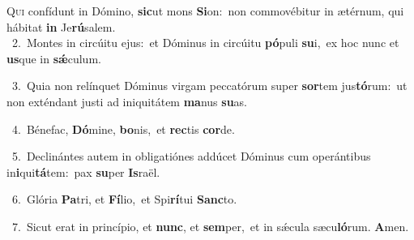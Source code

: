 \lettrine{\initial\textcolor{\initialcolor}{Q}}{ui} confídunt in Dómino, \textbf{sic}\-ut mons \textbf{Si}\-on:~\star non commovébitur in ætérnum, qui hábitat \textbf{in} Je\-\textbf{rú}\-salem.\\
{\numbfont\textcolor{\numbcolor}{~2.}}~Montes in circúitu ejus:~\dagger et Dóminus in circúitu \textbf{pó}\-puli \textbf{su}\-i,~\star ex hoc nunc et \textbf{us}\-que in \textbf{sǽ}\-culum.\par
{\numbfont\textcolor{\numbcolor}{~3.}}~Quia non relínquet Dóminus virgam peccatórum super \textbf{sor}\-tem jus\-\textbf{tó}\-rum:~\star ut non exténdant justi ad iniquitátem \textbf{ma}\-nus \textbf{su}\-as.\par
{\numbfont\textcolor{\numbcolor}{~4.}}~Bénefac, \textbf{Dó}\-mine, \textbf{bo}\-nis,~\star et \textbf{rec}\-tis \textbf{cor}\-de.\par
{\numbfont\textcolor{\numbcolor}{~5.}}~Declinántes autem in obligatiónes addúcet Dóminus cum operántibus in\-\textbf{i}\-qui\-\textbf{tá}\-tem:~\star pax \textbf{su}\-per \textbf{Is}\-raël.\par
{\numbfont\textcolor{\numbcolor}{~6.}}~Glória \textbf{Pa}\-tri, et \textbf{Fí}\-lio,~\star et Spi\-\textbf{rí}\-tui \textbf{Sanc}\-to.\par
{\numbfont\textcolor{\numbcolor}{~7.}}~Sicut erat in princípio, et \textbf{nunc}\-, et \textbf{sem}\-per,~\star et in sǽcula sæcu\-\textbf{ló}\-rum. \textbf{A}\-men.\par
